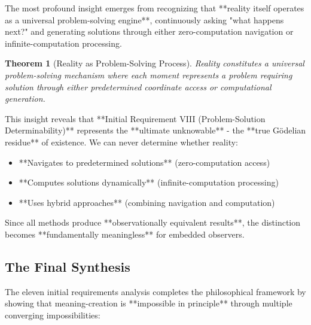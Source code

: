 \documentclass[12pt,a4paper]{article}
\newtheorem{theorem}{Theorem}[section]
\begin{document}
{{The most profound insight emerges from recognizing that **reality itself operates as a universal problem-solving engine**, continuously asking "what happens next?" and generating solutions through either zero-computation navigation or infinite-computation processing.

\begin{theorem}[Reality as Problem-Solving Process]
Reality constitutes a universal problem-solving mechanism where each moment represents a problem requiring solution through either predetermined coordinate access or computational generation.
\end{theorem}

This insight reveals that **Initial Requirement VIII (Problem-Solution Determinability)** represents the **ultimate unknowable** - the **true Gödelian residue** of existence. We can never determine whether reality:

\begin{itemize}
\item **Navigates to predetermined solutions** (zero-computation access)
\item **Computes solutions dynamically** (infinite-computation processing)  
\item **Uses hybrid approaches** (combining navigation and computation)
\end{itemize}

Since all methods produce **observationally equivalent results**, the distinction becomes **fundamentally meaningless** for embedded observers.

\subsection{The Final Synthesis}

The eleven initial requirements analysis completes the philosophical framework by showing that meaning-creation is **impossible in principle** through multiple converging impossibilities:

}}
\end{document}
